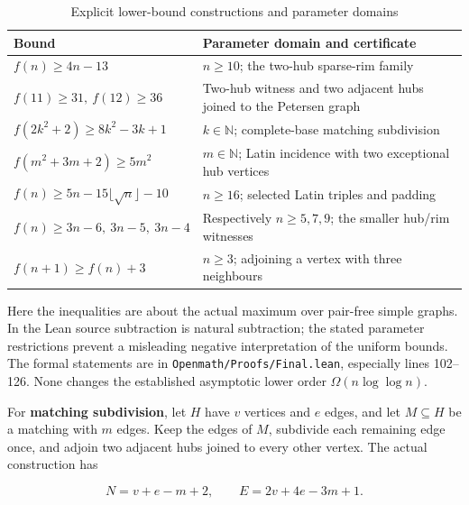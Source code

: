 \documentclass[smallextended]{svjour3}
\begin{document}
{
\begin{longtable}[]{@{}
  >{\raggedright\arraybackslash}p{}
  >{\raggedright\arraybackslash}p{}@{}}
\caption{Explicit lower-bound constructions and parameter domains}\label{tab:lower-bound-map}\\
\toprule\noalign{}
\begin{minipage}[b]{\linewidth}\raggedright
Bound
\end{minipage} & \begin{minipage}[b]{\linewidth}\raggedright
Parameter domain and certificate
\end{minipage} \\
\midrule\noalign{}
\endhead
\bottomrule\noalign{}
\endlastfoot
\(f(n)\ge4n-13\) & \(n\ge10\); the two-hub sparse-rim family \\
\(f(11)\ge31,\ f(12)\ge36\) & Two-hub witness and two adjacent hubs
joined to the Petersen graph \\
\(f(2k^2+2)\ge8k^2-3k+1\) & \(k\in\mathbb{N}\); complete-base matching
subdivision \\
\(f(m^2+3m+2)\ge5m^2\) & \(m\in\mathbb{N}\); Latin incidence with two
exceptional hub vertices \\
\(f(n)\ge5n-15\lfloor\sqrt{n}\rfloor-10\) & \(n\ge16\); selected Latin
triples and padding \\
\(f(n)\ge3n-6,\ 3n-5,\ 3n-4\) & Respectively \(n\ge5,7,9\); the smaller
hub/rim witnesses \\
\(f(n+1)\ge f(n)+3\) & \(n\ge3\); adjoining a vertex with three
neighbours \\
\end{longtable}
}

Here the inequalities are about the actual maximum over pair-free simple
graphs. In the Lean source subtraction is natural subtraction; the
stated parameter restrictions prevent a misleading negative
interpretation of the uniform bounds. The formal statements are in
\texttt{Openmath/Proofs/Final.lean}, especially lines 102--126. None
changes the established asymptotic lower order \(\Omega(n\log\log n)\).

For \textbf{matching subdivision}, let \(H\) have \(v\) vertices and
\(e\) edges, and let \(M\subseteq H\) be a matching with \(m\) edges.
Keep the edges of \(M\), subdivide each remaining edge once, and adjoin
two adjacent hubs joined to every other vertex. The actual construction
has

\[N=v+e-m+2,\qquad E=2v+4e-3m+1.\]
\end{document}
